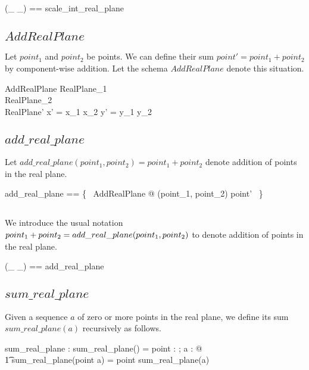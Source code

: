 \documentclass[11pt, oneside]{article}
\begin{document}
\begin{zed}
	(\_ \smulZRtwo \_) == scale\_int\_real\_plane
\end{zed}

\subsection{$AddRealPlane$}

Let $point_1$ and $point_2$ be points.
We can define their sum $point' = point_1 + point_2$ by component-wise addition.
Let the schema $AddRealPlane$ denote this situation.

\begin{schema}{AddRealPlane}
	RealPlane_1 \\
	RealPlane_2 \\
	RealPlane'
\where
	x' = x_1 \addR x_2
\also
	y' = y_1 \addR y_2
\end{schema}

\subsection{$add\_real\_plane$}

Let $add\_real\_plane(point_1, point_2) = point_1 + point_2$ denote addition of points in the
real plane.

\begin{zed}
	add\_real\_plane == \{~ AddRealPlane @ (point_1, point_2) \mapsto point' ~\}
\end{zed}

\subsection{}

We introduce the usual notation $point_1 \mathbin{+} point_2 = add\_real\_plane(point_1, point_2)$
to denote addition of points in the real plane.

\begin{zed}
	(\_ \addRtwo \_) == add\_real\_plane
\end{zed}

\subsection{$sum\_real\_plane$}

Given a sequence $a$ of zero or more points in the real plane,
we define its sum $sum\_real\_plane(a)$ recursively as follows.

\begin{axdef}
	sum\_real\_plane : \seq \Rtwo \fun \Rtwo
\where
	sum\_real\_plane(\langle \rangle) = \zeroRtwo
\also
	\forall point : \Rtwo; a : \seq \Rtwo @ \\
	\t1	sum\_real\_plane(\langle point \rangle \cat a) = point \addRtwo sum\_real\_plane(a)
\end{axdef}
\end{document}
